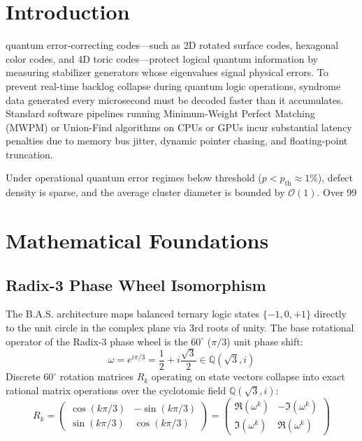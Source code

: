 \documentclass[10pt,journal,compsoc]{IEEEtran}
\begin{document}
\maketitle
\IEEEdisplaynontitleabstractindextext
\IEEEpeerreviewmaketitle

\section{Introduction}
 quantum error-correcting codes---such as 2D rotated surface codes, hexagonal color codes, and 4D toric codes---protect logical quantum information by measuring stabilizer generators whose eigenvalues signal physical errors. To prevent real-time backlog collapse during quantum logic operations, syndrome data generated every microsecond must be decoded faster than it accumulates. Standard software pipelines running Minimum-Weight Perfect Matching (MWPM) or Union-Find algorithms on CPUs or GPUs incur substantial latency penalties due to memory bus jitter, dynamic pointer chasing, and floating-point truncation.

Under operational quantum error regimes below threshold ($p < p_{\text{th}} \approx 1\%$), defect density is sparse, and the average cluster diameter is bounded by $\mathcal{O}(1)$. Over 99%

\section{Mathematical Foundations}

\subsection{Radix-3 Phase Wheel Isomorphism}
The B.A.S. architecture maps balanced ternary logic states $\{-1, 0, +1\}$ directly to the unit circle in the complex plane via 3rd roots of unity. The base rotational operator of the Radix-3 phase wheel is the $60^\circ$ ($\pi/3$) unit phase shift:
\begin{equation}
\omega = e^{i\pi/3} = \frac{1}{2} + i\frac{\sqrt{3}}{2} \in \mathbb{Q}(\sqrt{3}, i)
\end{equation}
Discrete $60^\circ$ rotation matrices $R_k$ operating on state vectors collapse into exact rational matrix operations over the cyclotomic field $\mathbb{Q}(\sqrt{3}, i)$:
\begin{equation}
R_k = \begin{pmatrix} \cos(k\pi/3) & -\sin(k\pi/3) \\ \sin(k\pi/3) & \cos(k\pi/3) \end{pmatrix} = \begin{pmatrix} \Re(\omega^k) & -\Im(\omega^k) \\ \Im(\omega^k) & \Re(\omega^k) \end{pmatrix}
\end{equation}
\end{document}
